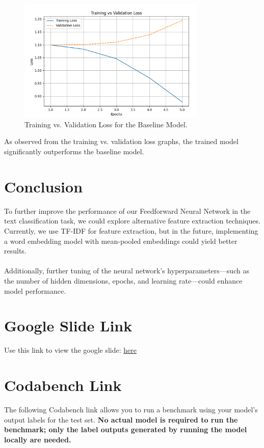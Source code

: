 \documentclass{article}
\begin{document}
\begin{figure}[h]
    \centering
    \includegraphics[width=0.8\textwidth]{baseline.png}
    \caption{Training vs. Validation Loss for the Baseline Model.}
    \label{fig:baseline_model}
\end{figure}
\FloatBarrier
\noindent
As observed from the training vs. validation loss graphs, the trained model significantly outperforms the baseline model.

\section*{Conclusion}
 
To further improve the performance of our Feedforward Neural Network in the text classification task, we could explore alternative feature extraction techniques. Currently, we use TF-IDF for feature extraction, but in the future, implementing a word embedding model with mean-pooled embeddings could yield better results. \\ \\
\noindent
Additionally, further tuning of the neural network's hyperparameters—such as the number of hidden dimensions, epochs, and learning rate—could enhance model performance.

\section*{Google Slide Link}
Use this link to view the google slide:
\href{https://docs.google.com/presentation/d/15JIKdGahpr1_3U4SOMizo7lIihSOU8OwtrQclo2Uprg/edit?usp=sharing}{here}


\section*{Codabench Link}
The following Codabench link allows you to run a benchmark using your model's output labels for the test set. \textbf{No actual model is required to run the benchmark; only the label outputs generated by running the model locally are needed.}
\end{document}
